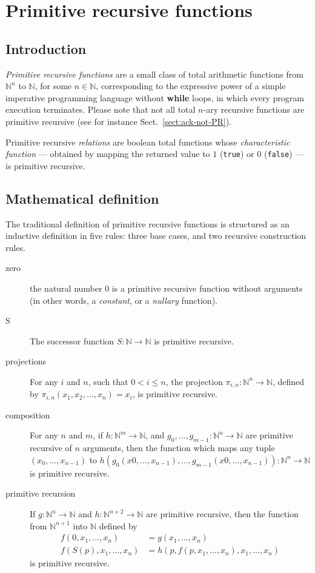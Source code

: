 \chapter{Primitive recursive functions}
\label{chapter:primrec}

\section{Introduction}
\emph{Primitive recursive functions} are a small class of total arithmetic functions  from $\mathbb{N}^n$ to
$\mathbb{N}$, for some $n\in\mathbb{N}$, corresponding to the expressive power of a simple imperative programming language without \textbf{while} loops, in which every program execution terminates.
Please  note that not all 
total $n$-ary recursive functions are primitive recursive
(see for instance Sect.~\vref{sect:ack-not-PR}).

Primitive recursive \emph{relations} are boolean total functions whose \emph{characteristic function} --- obtained by mapping the returned value to $1$ (\texttt{true}) or $0$ (\texttt{false}) ---  is primitive recursive.

\section{Mathematical definition}
\label{sect:primrecmathdef}

The traditional definition of primitive recursive functions is structured as an inductive definition 
in five rules: three base cases, and two recursive construction rules. 


\begin{description}
  \item[zero] the natural number $0$ is a primitive recursive function without arguments (in other words, a  \emph{constant}, or a \emph{nullary} function).
\item[S] The successor function $S:\mathbb{N}\rightarrow\mathbb{N}$ is primitive recursive.
 \item[projections] For any $i$ and $n$, such that $0< i\leq n$, the projection $\pi_{i,n}: \mathbb{N}^n\rightarrow\mathbb{N}$, defined by $\pi_{i,n}(x_1,x_2,\dots,x_{n})=x_i$, is primitive recursive.
\item[composition] For any $n$ and $m$, if $h: \mathbb{N}^m\rightarrow\mathbb{N}$, and
$g_0,\dots, g_{m-1}: \mathbb{N}^n\rightarrow\mathbb{N}$ are primitive recursive of $n$ arguments, then the function which maps any
tuple $(x_0,\dots,x_{n-1})$ to $h(g_0(x0,\dots,x_{n-1}),\dots, g_{m-1}(x0,\dots,x_{n-1})): \mathbb{N}^n\rightarrow\mathbb{N}$ is primitive recursive.
\item[primitive recursion]
If $g: \mathbb{N}^n\rightarrow\mathbb{N}$ and $h: \mathbb{N}^{n+2}\rightarrow\mathbb{N}$ are primitive recursive, then the function from $\mathbb{N}^{n+1}$ into $\mathbb{N}$ defined by
\begin{align}
f(0,x_1,\dots,x_n)&=g(x_1,\dots,x_n)\\
f(S(p),x_1,\dots,x_n)&=h(p,f(p, x_1,\dots,x_n),  x_1,\dots,x_n)
\end{align} 
is primitive recursive.
\end{description}



